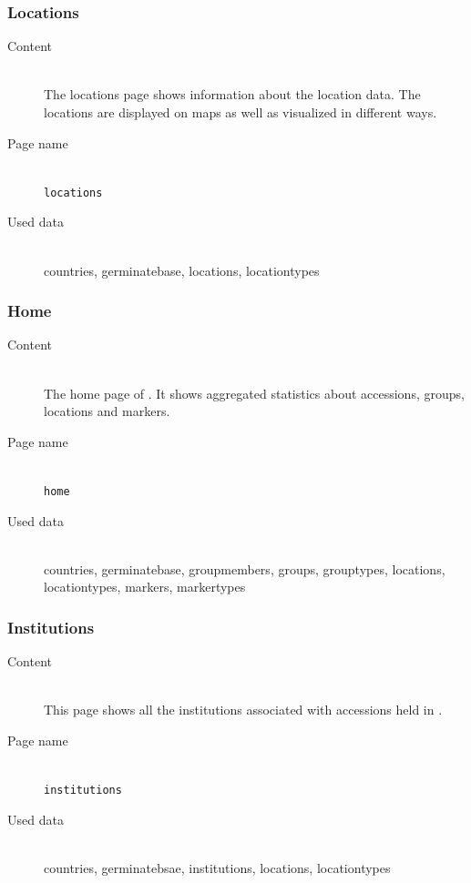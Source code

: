 \subsubsection{Locations}
\begin{description}
	\item[Content]\hfill\\The locations page shows information about the location data. The locations are displayed on maps as well as visualized in different ways.
	\item[Page name]\hfill\\\texttt{locations}
	\item[Used data]\hfill\\countries, germinatebase, locations, locationtypes
	
\end{description}

\subsubsection{Home}
\begin{description}
	\item[Content]\hfill\\The home page of {\germinate}. It shows aggregated statistics about accessions, groups, locations and markers.
	\item[Page name]\hfill\\\texttt{home}
	\item[Used data]\hfill\\countries, germinatebase, groupmembers, groups, grouptypes, locations, locationtypes, markers, markertypes
\end{description}

\subsubsection{Institutions}
\begin{description}
	\item[Content]\hfill\\This page shows all the institutions associated with accessions held in {\germinate}.
	\item[Page name]\hfill\\\texttt{institutions}
	\item[Used data]\hfill\\countries, germinatebsae, institutions, locations, locationtypes
\end{description}

